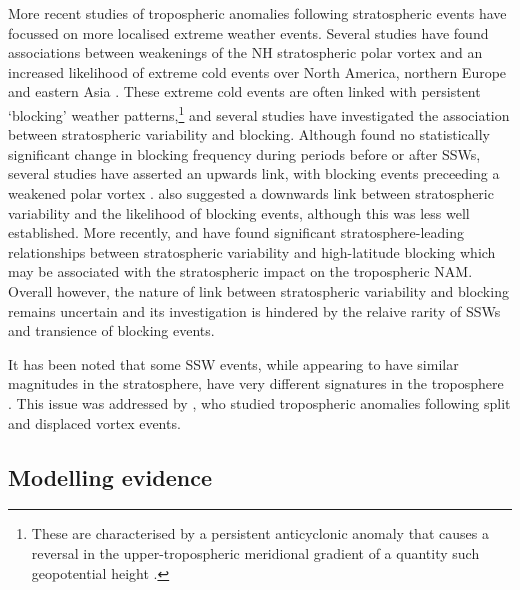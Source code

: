 More recent studies of tropospheric anomalies following stratospheric events
have focussed on more localised extreme weather events. Several studies have
found associations between weakenings of the NH stratospheric polar vortex and
an increased likelihood of extreme cold events over North America, northern
Europe and eastern Asia \citep{Thompson2002, Kolstad2010, Tomassini2012}. These
extreme cold events are often linked with persistent `blocking' weather
patterns,\footnote{These are characterised by a persistent anticyclonic anomaly
  that causes a reversal in the upper-tropospheric meridional gradient of a
  quantity such geopotential height \citep[e.g.,][]{Tibaldi1990}.}  and several
studies have investigated the association between stratospheric variability and
blocking. Although \citet{Taguchi2008} found no statistically significant change
in blocking frequency during periods before or after SSWs, several studies have
asserted an upwards link, with blocking events preceeding a weakened polar
vortex \citep{Quiroz1986, Andrews1987, ONeill1994, Martius2009,
  Castanheria2010}. \citet{KoderaChiba1995} also suggested a downwards link
between stratospheric variability and the likelihood of blocking events,
although this was less well established. More recently, \citet{Woollings2010c}
and \citet{Davini2014} have found significant stratosphere-leading relationships
between stratospheric variability and high-latitude blocking which may be
associated with the stratospheric impact on the tropospheric NAM. Overall
however, the nature of link between stratospheric variability and blocking
remains uncertain and its investigation is hindered by the relaive rarity of
SSWs and transience of blocking events.

It has been noted that some SSW events, while appearing to have similar
magnitudes in the stratosphere, have very different signatures in the
troposphere \citep{Baldwin2001a,Tomassini2012}. This issue was addressed by
\citet{Mitchell2013}, who studied tropospheric anomalies following split and
displaced vortex events. 




\subsection{Modelling evidence}



